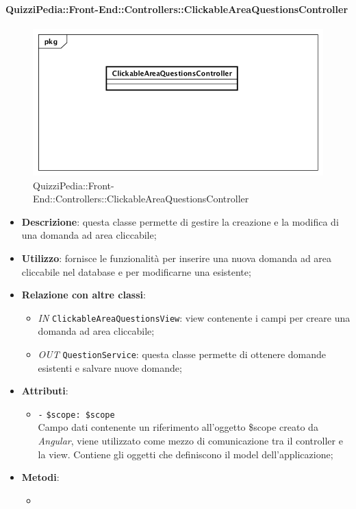 \paragraph{QuizziPedia::Front-End::Controllers::ClickableAreaQuestionsController}
\begin{figure} [ht]
	\centering
	\includegraphics[scale=0.45]{UML/Classi/Front-End/QuizziPedia_Front-end_Controller_ClickableAreaQuestionsController.png}
	\caption{QuizziPedia::Front-End::Controllers::ClickableAreaQuestionsController}
\end{figure} \FloatBarrier
\begin{itemize}
	\item \textbf{Descrizione}: questa classe permette di gestire la creazione e la modifica di una domanda ad area cliccabile;
	\item \textbf{Utilizzo}: fornisce le funzionalità per inserire una nuova domanda ad area cliccabile nel database e per modificarne una esistente;
	\item \textbf{Relazione con altre classi}:
	\begin{itemize}
		\item \textit{IN} \texttt{ClickableAreaQuestionsView}: view contenente i campi per creare una domanda ad area cliccabile; 
		\item \textit{OUT} \texttt{QuestionService}: questa classe permette di ottenere domande esistenti e salvare nuove domande;
	\end{itemize}
	\item \textbf{Attributi}:
	\begin{itemize}
		\item \texttt{-} \texttt{\$scope: \$scope} \\
		Campo dati contenente un riferimento all’oggetto \$scope creato da \textit{Angular}, viene utilizzato come mezzo di comunicazione tra il controller e la view. Contiene gli oggetti che definiscono il model dell’applicazione;
	\end{itemize}
	\item \textbf{Metodi}:
	\begin{itemize}
		\item 
	\end{itemize}
\end{itemize}

